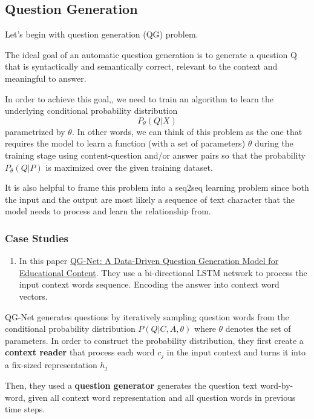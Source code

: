 \documentclass[]{book}
\providecommand{\tightlist}{%
  \setlength{\itemsep}{0pt}\setlength{\parskip}{0pt}}
\theoremstyle{definition}
\theoremstyle{definition}
\theoremstyle{definition}
\theoremstyle{remark}
\begin{document}
\subsection{Question Generation}\label{question-generation}

Let's begin with question generation (QG) problem.

The ideal goal of an automatic question generation is to generate a
question Q that is syntactically and semantically correct, relevant to
the context and meaningful to answer.

In order to achieve this goal,, we need to train an algorithm to learn
the underlying conditional probability distribution \[P_{\theta}(Q|X)\]
parametrized by \(\theta\). In other words, we can think of this problem
as the one that requires the model to learn a function (with a set of
parameters) \(\theta\) during the training stage using content-question
and/or answer pairs so that the probability \(P_{\theta}(Q|P)\) is
maximized over the given training dataset.

It is also helpful to frame this problem into a seq2seq learning problem
since both the input and the output are most likely a sequence of text
character that the model needs to process and learn the relationship
from.

\subsubsection{Case Studies}\label{case-studies}

\begin{enumerate}
\def\labelenumi{\arabic{enumi}.}
\tightlist
\item
  In this paper
  \href{http://www.princeton.edu/~shitingl/papers/18l@s-qgen.pdf}{QG-Net:
  A Data-Driven Question Generation Model for Educational Content}. They
  use a bi-directional LSTM network to process the input context words
  sequence. Encoding the answer into context word vectors.
\end{enumerate}

QG-Net generates questions by iteratively sampling question words from
the conditional probability distribution \(P(Q|C,A,\theta)\) where
\(\theta\) denotes the set of parameters. In order to construct the
probability distribution, they first create a \textbf{context reader}
that process each word \(c_j\) in the input context and turns it into a
fix-sized representation \(h_j\)

Then, they used a \textbf{question generator} generates the question
text word-by-word, given all context word representation and all
question words in previous time steps.
\end{document}
